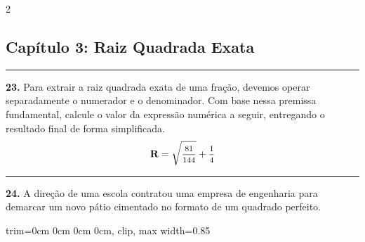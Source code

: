 \documentclass[twoside, 10pt, a4paper]{article}
\newlength{\espacoPosTitulo}\setlength{\espacoPosTitulo}{0.3cm}
\newlength{\espacoPreQuestao}\setlength{\espacoPreQuestao}{0.1cm}
\newlength{\espacoQuestao}\setlength{\espacoQuestao}{0.2cm}
\newcommand{\larguraTikz}{0.85\linewidth}
\begin{document}
\begin{multicols*}{2}
\subsection*{Capítulo 3: Raiz Quadrada Exata}
\vspace{-0.2cm}\noindent\rule{\linewidth}{1.5pt} 
\par\vspace{\espacoPosTitulo}
\textbf{23.} Para extrair a raiz quadrada exata de uma fração, devemos operar separadamente o numerador e o denominador. Com base nessa premissa fundamental, calcule o valor da expressão numérica a seguir, entregando o resultado final de forma simplificada.
$$ \textbf{R} = \sqrt{\mfrac{81}{144}} + \mfrac{1}{4} $$
\par\vspace{\espacoQuestao}

\noindent\textcolor{CorLinha}{\rule{\linewidth}{0.5pt}} 
\par\vspace{\espacoPreQuestao}
\textbf{24.} A direção de uma escola contratou uma empresa de engenharia para demarcar um novo pátio cimentado no formato de um quadrado perfeito.
\begin{center}
\begin{adjustbox}{trim=0cm 0cm 0cm 0cm, clip, max width=\larguraTikz}
\end{adjustbox}
\end{center}
\end{multicols*}
\end{document}
